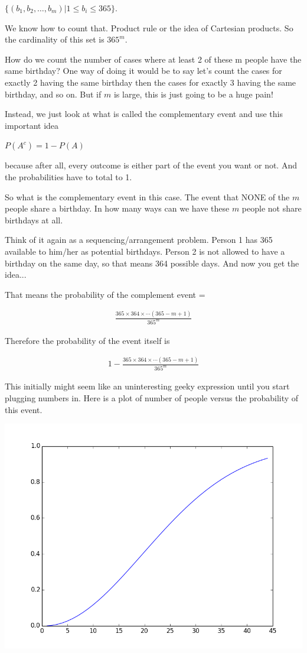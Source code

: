 \documentclass[12pt]{article}
\begin{document}
$\{(b_1, b_2, \ldots, b_m)| 1 \le b_i \le 365 \}$.

We know how to count that. Product rule or the idea of Cartesian products. So the cardinality of this set is $365^m$.

How do we count the number of cases where at least 2 of these m people have the same birthday?
One way of doing it would be to say let's count the cases for exactly 2 having the same birthday then the cases for exactly 3 having the same birthday, and so on. But if $m$ is large, this is just going to be a huge pain!

Instead, we just look at what is called the complementary event and use this important idea

$P(A^c) = 1 - P(A)$ 

because after all, every outcome is either part of the event you want or not. And the probabilities have to total to 1.

So what is the complementary event in this case. The event that NONE of the $m$ people share a birthday. In how many ways can we have these $m$ people not share birthdays at all.

Think of it again as a sequencing/arrangement problem. Person 1 has 365 available to him/her as potential birthdays. Person 2 is not allowed to have a birthday on the same day, so that means 364 possible days. And now you get the idea...

That means the probability of the complement event = 

\begin{align*}
\frac{365 \times 364 \times \cdots (365-m+1)}{365^m}
\end{align*}

Therefore the probability of the event itself is

\begin{align*}
1 - \frac{365 \times 364 \times \cdots (365-m+1)}{365^m}
\end{align*}

This initially might seem like an uninteresting geeky expression until you start plugging numbers in. Here is a plot of number of people versus the probability of this event.

\includegraphics[scale=0.6]{birthday.png}
\end{document}
